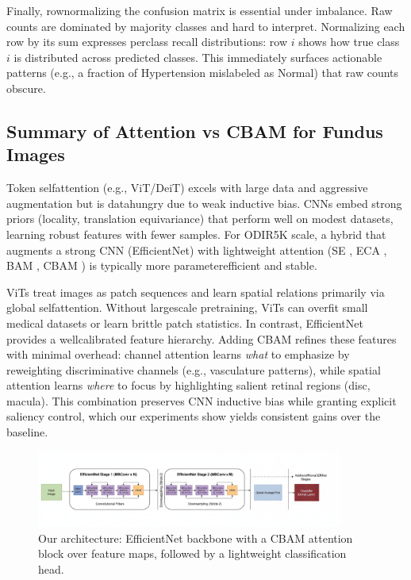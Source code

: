 Finally, row\textendash normalizing the confusion matrix is essential under imbalance. Raw counts are dominated by majority classes and hard to interpret. Normalizing each row by its sum expresses per\textendash class recall distributions: row $i$ shows how true class $i$ is distributed across predicted classes. This immediately surfaces actionable patterns (e.g., a fraction of Hypertension mislabeled as Normal) that raw counts obscure.

\subsection{Summary of Attention vs CBAM for Fundus Images}
Token self\textendash attention (e.g., ViT/DeiT) excels with large data and aggressive augmentation but is data\textendash hungry due to weak inductive bias. CNNs embed strong priors (locality, translation equivariance) that perform well on modest datasets, learning robust features with fewer samples. For ODIR\textendash 5K scale, a hybrid that augments a strong CNN (EfficientNet) with lightweight attention (SE \cite{hu2018squeeze}, ECA \cite{wang2020eca}, BAM \cite{park2018bam}, CBAM \cite{woo2018cbam}) is typically more parameter\textendash efficient and stable.

ViTs treat images as patch sequences and learn spatial relations primarily via global self\textendash attention. Without large\textendash scale pretraining, ViTs can overfit small medical datasets or learn brittle patch statistics. In contrast, EfficientNet provides a well\textendash calibrated feature hierarchy. Adding CBAM refines these features with minimal overhead: channel attention learns \emph{what} to emphasize by re\textendash weighting discriminative channels (e.g., vasculature patterns), while spatial attention learns \emph{where} to focus by highlighting salient retinal regions (disc, macula). This combination preserves CNN inductive bias while granting explicit saliency control, which our experiments show yields consistent gains over the baseline.

\begin{figure}[t]
  \centering
  \includegraphics[width=0.9\textwidth]{../new_work/figures/about-cbam/EfficientNet-placement-with-CBAM-architecture.png}
  \caption{Our architecture: EfficientNet backbone with a CBAM attention block over feature maps, followed by a lightweight classification head.}
  \label{fig:cbam_arch}
\end{figure}

